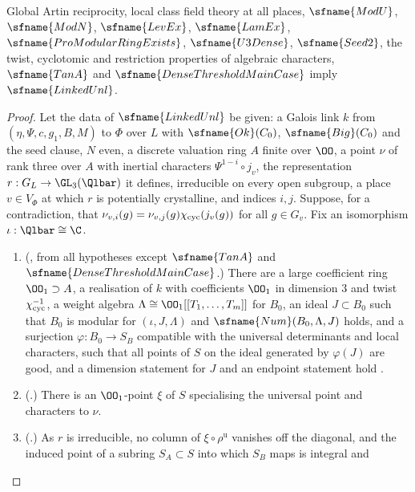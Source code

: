 \begin{theorem}\label{pf:modularity:linkedunl}
Global Artin reciprocity, local class field theory at all places, $\sfname{ModU}$, $\sfname{ModN}$, $\sfname{LevEx}$,
$\sfname{LamEx}$, $\sfname{ProModularRingExists}$, $\sfname{U3Dense}$, $\sfname{Seed2}$, the twist, cyclotomic and
restriction properties of algebraic characters, $\sfname{TanA}$ and $\sfname{DenseThresholdMainCase}$ imply
$\sfname{LinkedUnl}$.
\end{theorem}

\begin{proof}
Let the data of $\sfname{LinkedUnl}$ be given: a Galois link $k$ from $(\eta,\Psi,c,g_1,B,M)$ to $\Phi$ over $L$ with
$\sfname{Ok}(C_0)$, $\sfname{Big}(C_0)$ and the seed clause, $N$ even, a discrete valuation ring $A$ finite over $\OO$, a
point $\nu$ of rank three over $A$ with inertial characters $\Psi^{1-i}\circ j_v$, the representation $r:G_L\to\GL_3(\Qlbar)$
it defines, irreducible on every open subgroup, a place $v\in V_\Phi$ at which $r$ is potentially crystalline, and indices
$i,j$. Suppose, for a contradiction, that $\nu_{v,i}(g)=\nu_{v,j}(g)\chi_{\mathrm{cyc}}(j_v(g))$ for all $g\in G_v$. Fix an
isomorphism $\iota:\Qlbar\cong\C$.
\begin{enumerate}[label=(\arabic*)]
\item (, from all hypotheses except $\sfname{TanA}$ and
$\sfname{DenseThresholdMainCase}$.) There are a large coefficient ring $\OO_1\supset A$, a realisation of $k$ with
coefficients $\OO_1$ in dimension $3$ and twist $\chi_{\mathrm{cyc}}^{-1}$, a weight algebra $\Lambda\cong\OO_1[[T_1,\dots,T_m]]$
for $B_0$, an ideal $J\subset B_0$ such that $B_0$ is modular for $(\iota,J,\Lambda)$ and $\sfname{Num}(B_0,\Lambda,J)$
holds, and a surjection $\varphi:B_0\to S_B$ compatible with the universal determinants and local characters, such that all
points of $S$ on the ideal generated by $\varphi(J)$ are good, and a dimension statement for $J$ and an endpoint statement
hold \cite{LeanSource2026}.
\item (.) There is an $\OO_1$-point $\xi$ of $S$ specialising the universal point and
characters to $\nu$.
\item (.) As $r$ is irreducible, no column of $\xi\circ\rho^{\mathrm u}$ vanishes off the
diagonal, and the induced point of a subring $S_A\subset S$ into which $S_B$ maps \cite{LeanSource2026} is integral and

\end{enumerate}
\end{proof}
